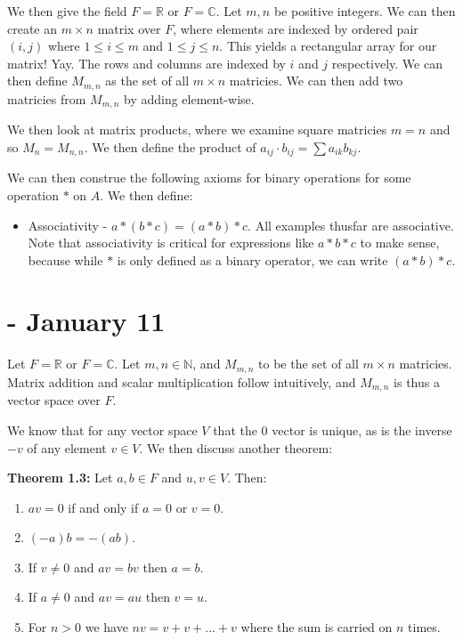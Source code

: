 \documentclass{report}
\begin{document}
We then give the field $F = \mathbb{R}$ or $F = \mathbb{C}$. Let $m,n$ be positive integers. We can then create an $m \times n$ matrix over $F$, where elements are indexed by ordered pair $(i,j)$ where $1 \leq i \leq m$ and $1 \leq j \leq n$. This yields a rectangular array for our matrix! Yay. The rows and columns are indexed by $i$ and $j$ respectively. We can then define $M_{m,n}$ as the set of all $m\times n$ matricies. We can then add two matricies from $M_{m,n}$ by adding element-wise.

We then look at matrix products, where we examine square matricies $m=n$ and so $M_n = M_{n,n}$. We then define the product of $a_{ij} \cdot b_{ij} = \sum{a_{ik}b_{kj}}$. 

We can then construe the following axioms for binary operations for some operation $*$ on $A$. We then define:

\begin{itemize}
\item Associativity - $a*(b*c) = (a*b)*c$. All examples thusfar are associative. Note that associativity is critical for expressions like $a*b*c$ to make sense, because while $*$ is only defined as a binary operator, we can write $(a*b)*c$.
\end{itemize}

\chapter{ - January 11}

Let $F = \mathbb{R}$ or $F = \mathbb{C}$. Let $m,n \in \mathbb{N}$, and $M_{m,n}$ to be the set of all $m \times n$ matricies. Matrix addition and scalar multiplication follow intuitively, and $M_{m,n}$ is thus a vector space over $F$.

We know that for any vector space $V$ that the $0$ vector is unique, as is the inverse $-v$ of any element $v\in V$. We then discuss another theorem:

\begin{center}
\textbf{Theorem 1.3:} Let $a,b \in F$ and $u,v \in V$. Then:
\begin{enumerate}
\item $av = 0$ if and only if $a=0$ or $v=0$. 
\item $(-a)b = -(ab)$.
\item If $v \neq 0$ and $av = bv$ then $a = b$.
\item If $a \neq 0$ and $av = au$ then $v = u$.
\item For $n > 0$ we have $nv = v + v +... + v$ where the sum is carried on $n$ times.
\end{enumerate}
\end{center}
\end{document}
